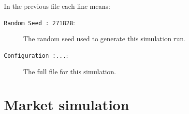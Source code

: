 \documentclass[11pt]{article}
\newcommand{\logfile}{../simulations_test_0_0_2014-05-12-13-36-04.txt}
\begin{document}


In the previous file each line means:
\begin{description}
\item[\texttt{Random Seed : 271828}:] The random seed used to generate this simulation run.
\item[\texttt{Configuration :...}:] The full  file for this simulation.
\end{description}

\section{Market simulation}
\end{document}
